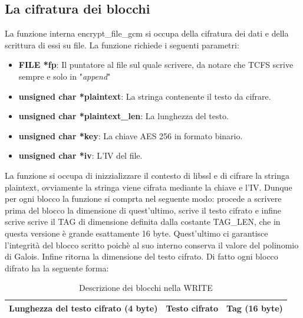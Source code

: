 \subsection{La cifratura dei blocchi}
La funzione interna encrypt\_file\_gcm si occupa della cifratura dei dati e della scrittura di essi su file. La funzione richiede i seguenti parametri:
    \begin{itemize}
        \item \textbf{FILE *fp}: Il puntatore al file sul quale scrivere, da notare che TCFS scrive sempre e solo in "\textit{append}"
        \item \textbf{unsigned char *plaintext}: La stringa contenente il testo da cifrare.
        \item \textbf{unsigned char *plaintext\_len}: La lunghezza del testo.
        \item \textbf{unsigned char *key}: La chiave AES 256 in formato binario.
        \item \textbf{unsigned char *iv}: L'IV del file.
    \end{itemize}
La funzione si occupa di inizzializzare il contesto di libssl e di cifrare la stringa plaintext, ovviamente la stringa viene cifrata mediante la chiave e l'IV. Dunque per ogni blocco la funzione si comprta nel seguente modo: procede a scrivere prima del blocco la dimensione di quest'ultimo, scrive il testo cifrato e infine scrive scrive il TAG di dimensione definita dalla costante TAG\_LEN, che in questa versione è grande esattamente 16 byte. Quest'ultimo ci garantisce l'integrità del blocco scritto poichè al suo interno conserva il valore del polinomio di Galois. Infine ritorna la dimensione del testo cifrato.
Di fatto ogni blocco difrato ha la seguente forma:
\begin{table}[htbp]
        \centering
        \begin{tabular}{|l|l|l|}
            \hline
            Lunghezza del testo cifrato (4 byte) & Testo cifrato & Tag (16 byte)\\
            \hline
        \end{tabular}
        \caption{Descrizione dei blocchi nella WRITE}
    \label{tab:tabella-blocchi-write}
\end{table}

